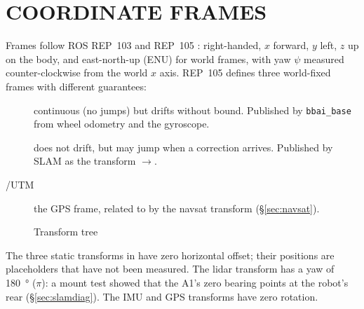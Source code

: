 \section{COORDINATE FRAMES}
\label{sec:frames}

Frames follow ROS REP~103 and REP~105 \cite{rep103,rep105}: right-handed,
$x$ forward, $y$ left, $z$ up on the body, and east-north-up (ENU) for world
frames, with yaw $\psi$ measured counter-clockwise from the world $x$ axis.
REP~105 defines three world-fixed frames with different guarantees:
\begin{description}
\item[] continuous (no jumps) but drifts without bound. Published by
  \texttt{bbai\_base} from wheel odometry and the gyroscope.
\item[] does not drift, but may jump when a correction arrives.
  Published by SLAM as the transform $\to$.
\item[/UTM] the GPS frame, related to  by the navsat
  transform (\S\ref{sec:navsat}).
\end{description}

\begin{figure}[htbp]
\centering
{}
\caption{Transform tree}
\label{fig:tf}
\end{figure}

The three static transforms in  have zero horizontal
offset; their positions are placeholders that have not been measured. The
lidar transform has a yaw of \SI{180}{\degree} ($\pi$): a mount test showed
that the A1's zero bearing points at the robot's rear (\S\ref{sec:slamdiag}).
The IMU and GPS transforms have zero rotation.

